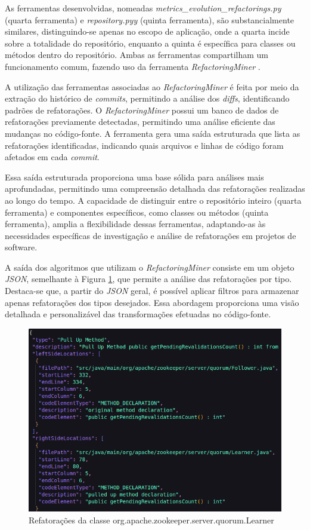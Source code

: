 As ferramentas desenvolvidas, nomeadas \textit{metrics\_evolution\_refactorings.py} \cite{RefactoringMiner:RepositoryRefactors:2023} (quarta ferramenta) e \textit{repository.pyy} \cite{RefactoringMiner:MetricsEvolution:2023} (quinta ferramenta),  são substancialmente similares, distinguindo-se apenas no escopo de aplicação, onde a quarta  incide sobre a totalidade do repositório, enquanto a quinta é específica para classes ou métodos dentro do repositório. Ambas as ferramentas compartilham um funcionamento comum, fazendo uso da ferramenta \textit{RefactoringMiner} \cite{Tsantalis:ICSE:2018:RefactoringMiner}.

A utilização das ferramentas associadas ao \textit{RefactoringMiner} é feita por meio da extração do histórico de \textit{commits}, permitindo a análise dos \textit{diffs}, identificando padrões de refatorações. O \textit{RefactoringMiner} possui um banco de dados de refatorações previamente detectadas, permitindo uma análise eficiente das mudanças no código-fonte. A ferramenta gera uma saída estruturada que lista as refatorações identificadas, indicando quais arquivos e linhas de código foram afetados em cada \textit{commit}.

Essa saída estruturada proporciona uma base sólida para análises mais aprofundadas, permitindo uma compreensão detalhada das refatorações realizadas ao longo do tempo. A capacidade de distinguir entre o repositório inteiro (quarta ferramenta) e componentes específicos, como classes ou métodos (quinta ferramenta), amplia a flexibilidade dessas ferramentas, adaptando-as às necessidades específicas de investigação e análise de refatorações em projetos de software.

A saída dos algoritmos que utilizam o \textit{RefactoringMiner} consiste em um objeto \textit{JSON}, semelhante à Figura \ref{fig:RefactoringMinerOutput}, que permite a análise das refatorações por tipo. Destaca-se que, a partir do \textit{JSON} geral, é possível aplicar filtros para armazenar apenas refatorações dos tipos desejados. Essa abordagem proporciona uma visão detalhada e personalizável das transformações efetuadas no código-fonte.

\begin{figure}[h]
    \centering
    \includegraphics[width=0.8\linewidth]{figuras/Output/RefactoringMiner/org.apache.zookeeper.server.quorum.Learner.png}
    \caption{Refatorações da classe org.apache.zookeeper.server.quorum.Learner}
    \label{fig:RefactoringMinerOutput}
\end{figure}

